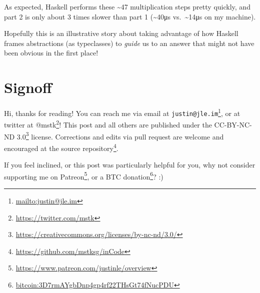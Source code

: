 \documentclass[]{article}
\newenvironment{Shaded}{}{}
\newcommand{\CommentTok}[1]{\textcolor[rgb]{0.38,0.63,0.69}{\textit{#1}}}
\newcommand{\DataTypeTok}[1]{\textcolor[rgb]{0.56,0.13,0.00}{#1}}
\newcommand{\DecValTok}[1]{\textcolor[rgb]{0.25,0.63,0.44}{#1}}
\newcommand{\FunctionTok}[1]{\textcolor[rgb]{0.02,0.16,0.49}{#1}}
\newcommand{\KeywordTok}[1]{\textcolor[rgb]{0.00,0.44,0.13}{\textbf{#1}}}
\newcommand{\NormalTok}[1]{#1}
\newcommand{\OperatorTok}[1]{\textcolor[rgb]{0.40,0.40,0.40}{#1}}
\newcommand{\OtherTok}[1]{\textcolor[rgb]{0.00,0.44,0.13}{#1}}
\renewcommand{\href}[2]{#2\footnote{\url{#1}}}
\begin{document}
\begin{Shaded}
\end{Shaded}

As expected, Haskell performs these \textasciitilde47 multiplication steps
pretty quickly, and part 2 is only about 3 times slower than part 1
(\textasciitilde40μs vs.~\textasciitilde14μs on my machine).

Hopefully this is an illustrative story about taking advantage of how Haskell
frames abstractions (as typeclasses) to \emph{guide} us to an answer that might
not have been obvious in the first place!

\hypertarget{signoff}{%
\section{Signoff}\label{signoff}}

Hi, thanks for reading! You can reach me via email at
\href{mailto:justin@jle.im}{\nolinkurl{justin@jle.im}}, or at twitter at
\href{https://twitter.com/mstk}{@mstk}! This post and all others are published
under the \href{https://creativecommons.org/licenses/by-nc-nd/3.0/}{CC-BY-NC-ND
3.0} license. Corrections and edits via pull request are welcome and encouraged
at \href{https://github.com/mstksg/inCode}{the source repository}.

If you feel inclined, or this post was particularly helpful for you, why not
consider \href{https://www.patreon.com/justinle/overview}{supporting me on
Patreon}, or a \href{bitcoin:3D7rmAYgbDnp4gp4rf22THsGt74fNucPDU}{BTC donation}?
:)
\end{document}

